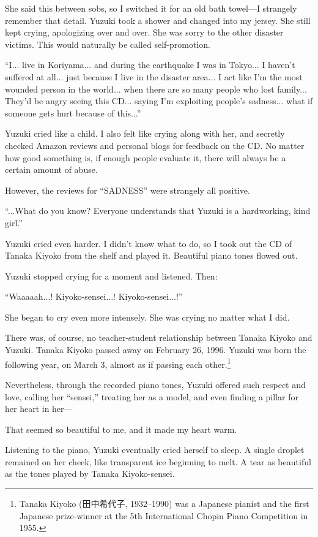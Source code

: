 \documentclass[
    a4paper,
    12pt,
    twoside,
    openany,
    UTF8,
    fontset=windows
]{ctexbook}
\begin{document}
She said this between sobs, so I switched it for an old bath towel---I strangely remember that detail. Yuzuki took a shower and changed into my jersey. She still kept crying, apologizing over and over. She was sorry to the other disaster victims. This would naturally be called self-promotion.

``I... live in Koriyama... and during the earthquake I was in Tokyo... I haven't suffered at all... just because I live in the disaster area... I act like I'm the most wounded person in the world... when there are so many people who lost family... They'd be angry seeing this CD... saying I'm exploiting people's sadness... what if someone gets hurt because of this...''

Yuzuki cried like a child. I also felt like crying along with her, and secretly checked Amazon reviews and personal blogs for feedback on the CD. No matter how good something is, if enough people evaluate it, there will always be a certain amount of abuse.

However, the reviews for ``SADNESS'' were strangely all positive.

``...What do you know? Everyone understands that Yuzuki is a hardworking, kind girl.''

Yuzuki cried even harder. I didn't know what to do, so I took out the CD of Tanaka Kiyoko from the shelf and played it. Beautiful piano tones flowed out.

Yuzuki stopped crying for a moment and listened. Then:

``Waaaaah...! Kiyoko-sensei...! Kiyoko-sensei...!''

She began to cry even more intensely. She was crying no matter what I did.

There was, of course, no teacher-student relationship between Tanaka Kiyoko and Yuzuki. Tanaka Kiyoko passed away on February 26, 1996. Yuzuki was born the following year, on March 3, almost as if passing each other.\footnote{Tanaka Kiyoko (田中希代子, 1932–1990) was a Japanese pianist and the first Japanese prize-winner at the 5th International Chopin Piano Competition in 1955.}

Nevertheless, through the recorded piano tones, Yuzuki offered such respect and love, calling her ``sensei,'' treating her as a model, and even finding a pillar for her heart in her---

That seemed so beautiful to me, and it made my heart warm.

Listening to the piano, Yuzuki eventually cried herself to sleep. A single droplet remained on her cheek, like transparent ice beginning to melt. A tear as beautiful as the tones played by Tanaka Kiyoko-sensei.
\end{document}

